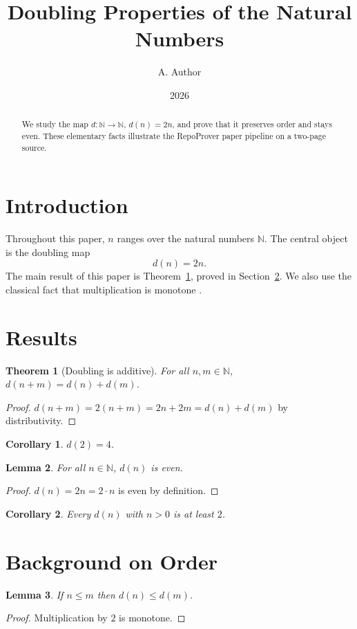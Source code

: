 \documentclass{article}
\title{Doubling Properties of the Natural Numbers}
\author{A. Author}
\date{2026}
\newtheorem{theorem}{Theorem}
\newtheorem{lemma}[theorem]{Lemma}
\newtheorem{corollary}{Corollary}
\begin{document}
\maketitle

\begin{abstract}
We study the map $d : \mathbb{N} \to \mathbb{N}$, $d(n) = 2n$, and prove that it
preserves order and stays even. These elementary facts illustrate the
RepoProver paper pipeline on a two-page source.
\end{abstract}

\section{Introduction}\label{sec:intro}

Throughout this paper, $n$ ranges over the natural numbers $\mathbb{N}$. The
central object is the doubling map
\[
d(n) = 2n.
\]
The main result of this paper is Theorem~\ref{thm:double-add}, proved in
Section~\ref{sec:results}. We also use the classical fact that multiplication
is monotone \cite{lean-mathlib}.



\section{Results}\label{sec:results}

\begin{theorem}[Doubling is additive]\label{thm:double-add}
For all $n, m \in \mathbb{N}$, $d(n + m) = d(n) + d(m)$.
\end{theorem}

\begin{proof}
$d(n + m) = 2(n + m) = 2n + 2m = d(n) + d(m)$ by distributivity.
\end{proof}

\begin{corollary}\label{cor:double-two}
$d(2) = 4$.
\end{corollary}

\begin{lemma}\label{lem:double-even}
For all $n \in \mathbb{N}$, $d(n)$ is even.
\end{lemma}

\begin{proof}
$d(n) = 2n = 2 \cdot n$ is even by definition.
\end{proof}

\begin{corollary}
Every $d(n)$ with $n > 0$ is at least $2$.
\end{corollary}

\appendix

\section{Background on Order}\label{app:order}

\begin{lemma}\label{lem:double-mono}
If $n \le m$ then $d(n) \le d(m)$.
\end{lemma}

\begin{proof}
Multiplication by $2$ is monotone.
\end{proof}



\end{document}
